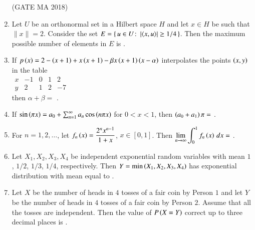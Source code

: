 \documentclass[journal,12pt,onecolumn]{IEEEtran}
\theoremstyle{remark}
\begin{document}
\begin{enumerate}[start=10]
\hfill(GATE MA 2018)

\item Let $U$ be an orthonormal set in a Hilbert space $H$ and let $x \in H$ be such that $\|x\| = 2$.
Consider the set $E = \{\, u \in U \colon \left\vert\langle x, u\rangle\right\vert \ge 1/4 \,\}$. Then the maximum possible number of elements in $E$ is \underline{\hspace{2cm}}.

\hfill{}

\item If $p\left(x\right) = 2 - \left(x+ 1\right) + x\left(x+ 1\right) - \beta x\left(x+ 1\right)\left(x- \alpha\right)$ interpolates the points $\left(x, y\right)$ in the table\\
$\begin{array}{c|c|c|c|c}
x & -1 & 0 & 1 & 2\\ \hline
y & 2 & 1 & 2 & -7
\end{array}$\\
then $\alpha + \beta = $ \underline{\hspace{2cm}}.

\hfill{}

\item If $\sin\left(\pi x\right) = a_0 + \sum_{n=1}^{\infty} a_n \cos\left(n\pi x\right)$ for $0 < x < 1$, then $\left(a_0 + a_1\right)\pi = $ \underline{\hspace{2cm}}. \\ 

\item For $n = 1, 2, \ldots$, let $f_n\left(x\right) = \dfrac{2^{n} x^{n- 1}}{1 + x}$, $x \in [0, 1]$. Then $\displaystyle \lim_{n \to \infty} \int_{0}^{1} f_n\left(x\right)\, dx = $ \underline{\hspace{2cm}}. \\ 

\item Let $X_1, X_2, X_3, X_4$ be independent exponential random variables with mean $1$, $1/2$, $1/3$, $1/4$,
respectively. Then $Y = \min\left(X_1, X_2, X_3, X_4\right)$ has exponential distribution with mean equal to \underline{\hspace{2cm}}. 

\hfill{}

\item Let $X$ be the number of heads in $4$ tosses of a fair coin by Person $1$ and let $Y$ be the number of
heads in $4$ tosses of a fair coin by Person $2$. Assume that all the tosses are independent. Then
the value of $P\left(X = Y\right)$ correct up to three decimal places is \underline{\hspace{2cm}}. \\ 


\end{enumerate}
\end{document}
